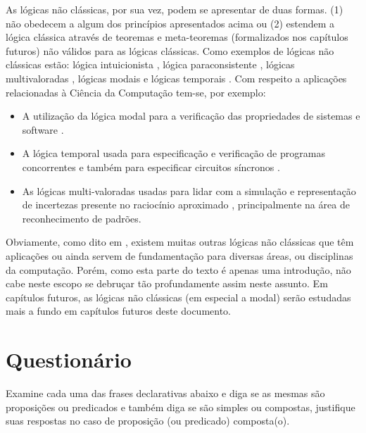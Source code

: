 As lógicas não clássicas, por sua vez, podem se apresentar de duas formas. (1) não obedecem a algum dos princípios apresentados acima ou (2) estendem a lógica clássica através de teoremas e meta-teoremas (formalizados nos capítulos futuros) não válidos para as lógicas clássicas. Como exemplos de lógicas não clássicas estão: lógica intuicionista \cite{lungarzo1972}, lógica paraconsistente \cite{da2008logica}, lógicas multivaloradas \cite{benja-Logica, magnus2020}, lógicas modais \cite{magnus2020} e lógicas temporais \cite{halpern1983, harel1979, manna1979}. Com respeito a aplicações relacionadas à Ciência da Computação tem-se, por exemplo:

\begin{itemize}
	\item A utilização da lógica modal para a verificação das propriedades de sistemas e software \cite{harel1979}.
	\item A lógica temporal usada para especificação e verificação de programas
concorrentes \cite{manna1979} e também para especificar circuitos síncronos \cite{halpern1983}.
	\item As lógicas multi-valoradas usadas para lidar com a simulação e representação de
incertezas presente no raciocínio aproximado \cite{benja-Logica}, principalmente na área de reconhecimento de padrões.
\end{itemize}

Obviamente, como dito em \cite{benja-Logica}, existem muitas outras lógicas não clássicas que têm aplicações ou ainda servem de fundamentação para diversas áreas, ou disciplinas da computação. Porém, como esta parte do texto é apenas uma introdução, não cabe neste escopo se debruçar tão profundamente assim neste assunto. Em capítulos futuros, as lógicas não clássicas (em especial a modal) serão estudadas mais a fundo em capítulos futuros deste documento.

\section{Questionário}\label{sec:Questionario1part3}

\begin{questao}
	Examine cada uma das frases declarativas abaixo e diga se as mesmas são proposições ou predicados e também diga se são simples ou compostas, justifique suas respostas no caso de proposição (ou predicado) composta(o).
\end{questao}

